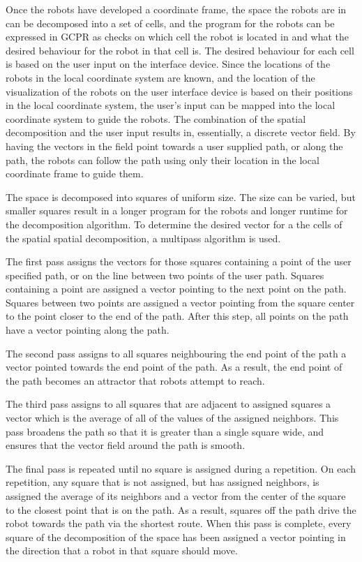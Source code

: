 Once the robots have developed a coordinate frame, the space the robots are in can be decomposed into a set of cells, and the program for the robots can be expressed in GCPR as checks on which cell the robot is located in and what the desired behaviour for the robot in that cell is. 
The desired behaviour for each cell is based on the user input on the interface device. Since the locations of the robots in the local coordinate system are known, and the location of the visualization of the robots on the user interface device is based on their positions in the local coordinate system, the user's input can be mapped into the local coordinate system to guide the robots. 
The combination of the spatial decomposition and the user input results in, essentially, a discrete vector field. 
By having the vectors in the field point towards a user supplied path, or along the path, the robots can follow the path using only their location in the local coordinate frame to guide them. 

The space is decomposed into squares of uniform size. The size can be varied, but smaller squares result in a longer program for the robots and longer runtime for the decomposition algorithm. 
To determine the desired vector for a the cells of the spatial spatial decomposition, a multipass algorithm is used. 

The first pass assigns the vectors for those squares containing a point of the user specified path, or on the line between two points of the user path. 
Squares containing a point are assigned a vector pointing to the next point on the path. 
Squares between two points are assigned a vector pointing from the square center to the point closer to the end of the path. 
After this step, all points on the path have a vector pointing along the path. 

The second pass assigns to all squares neighbouring the end point of the path a vector pointed towards the end point of the path. 
As a result, the end point of the path becomes an attractor that robots attempt to reach. 

The third pass assigns to all squares that are adjacent to assigned squares a vector which is the average of all of the values of the assigned neighbors. 
This pass broadens the path so that it is greater than a single square wide, and ensures that the vector field around the path is smooth. 

The final pass is repeated until no square is assigned during a repetition. 
On each repetition, any square that is not assigned, but has assigned neighbors, is assigned the average of its neighbors and a vector from the center of the square to the closest point that is on the path. 
As a result, squares off the path drive the robot towards the path via the shortest route. 
When this pass is complete, every square of the decomposition of the space has been assigned a vector pointing in the direction that a robot in that square should move. 

